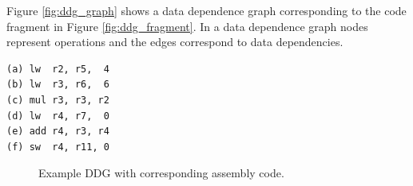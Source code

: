 Figure \ref{fig:ddg_graph} shows a data dependence graph corresponding to the code fragment in Figure \ref{fig:ddg_fragment}. In a data dependence graph nodes represent operations and the edges correspond to data dependencies.

\newsavebox{\ddgfragmentlst}
\begin{lrbox}{\ddgfragmentlst}
  \begin{lstlisting}
(a) lw  r2, r5,  4
(b) lw  r3, r6,  6
(c) mul r3, r3, r2
(d) lw  r4, r7,  0
(e) add r4, r3, r4
(f) sw  r4, r11, 0
  \end{lstlisting}
\end{lrbox}

\begin{figure}[H]
  \centering
   \quad\quad\quad\quad\quad\quad\quad\quad%
  \caption{Example DDG with corresponding assembly code.}
  \label{fig:ddg}
\end{figure}


